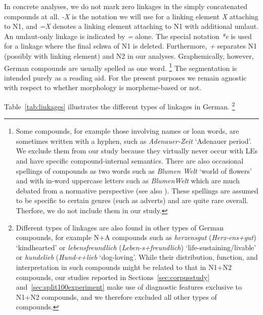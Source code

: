 In concrete analyses, we do not mark zero linkages in the simply concatenated compounds at all.
\textit{-X} is the notation we will use for a linking element \textit{X} attaching to N1, and \textit{=X} denotes a linking element attaching to N1 with additional umlaut.
An umlaut-only linkage is indicated by \textit{=} alone.
The special notation \textit{*e} is used for a linkage where the final schwa of N1 is deleted.
Furthermore, \textit{+} separates N1 (possibly with linking element) and N2 in our analyses.
Graphemically, however, German compounds are usually spelled as one word.%
\footnote{Some compounds, for example those involving names or loan words, are sometimes written with a hyphen, such as \textit{Adenauer-Zeit} `Adenauer period'.
We exclude them from our study because they virtually never occur with LEs and have specific compound-internal semantics.
There are also occasional spellings of compounds as two words such as \textit{Blumen Welt} `world of flowers' and with in-word uppercase letters such as \textit{BlumenWelt} which are much debated from a normative perspective (see also \citealt{Scherer2012}).
These spellings are assumed to be specific to certain genres (such as adverts) and are quite rare overall.
Therfore, we do not include them in our study.}
The segmentation is intended purely as a reading aid.
For the present purposes we remain agnostic with respect to whether morphology is morpheme-based or not.

Table~\ref{tab:linkages} illustrates the different types of linkages in German.%
\footnote{Different types of linkages are also found in other types of German compounds, for example N+A compounds such as \textit{herzensgut} (\textit{Herz-ens+gut}) `kindhearted' or \textit{lebensfreundlich} (\textit{Leben-s+freundlich}) `life-sustaining\slash livable' or \textit{hundelieb} (\textit{Hund-e+lieb} `dog-loving'.
While their distribution, function, and interpretation in such compounds might be related to that in N1+N2 compounds, our studies reported in Sections~\ref{sec:corpusstudy} and~\ref{sec:split100experiment} make use of diagnostic features exclusive to N1+N2 compounds, and we therefore excluded all other types of compounds.}

